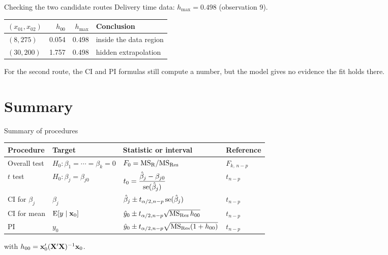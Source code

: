 \begin{frame}{Checking the two candidate routes}
    Delivery time data: $h_{\max} = 0.498$ (observation 9).
    \begin{center}
        \begin{tabular}{lrrl}
            \toprule
            $(x_{01}, x_{02})$ & $h_{00}$ & $h_{\max}$ & Conclusion \\
            \midrule
            $(8, 275)$ & 0.054 & 0.498 & inside the data region \\
            $(30, 200)$ & 1.757 & 0.498 & hidden extrapolation \\
            \bottomrule
        \end{tabular}
    \end{center}
    For the second route, the CI and PI formulas still compute a number, but the model gives no evidence the fit holds there.
\end{frame}



\section{Summary}


\begin{frame}{Summary of procedures}
    \begin{center}
        \begin{tabular}{llll}
            \toprule
            Procedure & Target & Statistic or interval & Reference \\
            \midrule
            Overall test & $H_0: \beta_1=\cdots=\beta_k=0$ & $F_0 = \mathrm{MS}_{\mathrm{R}}/\mathrm{MS}_{\mathrm{Res}}$ & $F_{k,\,n-p}$ \\
            $t$ test & $H_0: \beta_j = \beta_{j0}$ & $t_0 = \dfrac{\hat\beta_j - \beta_{j0}}{\operatorname{se}(\hat\beta_j)}$ & $t_{n-p}$ \\[1.5ex]
            CI for $\beta_j$ & $\beta_j$ & $\hat\beta_j \pm t_{\alpha/2,n-p}\operatorname{se}(\hat\beta_j)$ & $t_{n-p}$ \\[0.5ex]
            CI for mean & $\operatorname{E}[y \mid \mathbf{x}_0]$ & $\hat y_0 \pm t_{\alpha/2,n-p}\sqrt{\mathrm{MS}_{\mathrm{Res}}\, h_{00}}$ & $t_{n-p}$ \\[0.5ex]
            PI & $y_0$ & $\hat y_0 \pm t_{\alpha/2,n-p}\sqrt{\mathrm{MS}_{\mathrm{Res}}(1 + h_{00})}$ & $t_{n-p}$ \\
            \bottomrule
        \end{tabular}
    \end{center}
    with $h_{00} = \mathbf{x}_0'(\mathbf{X}'\mathbf{X})^{-1}\mathbf{x}_0$.
\end{frame}
